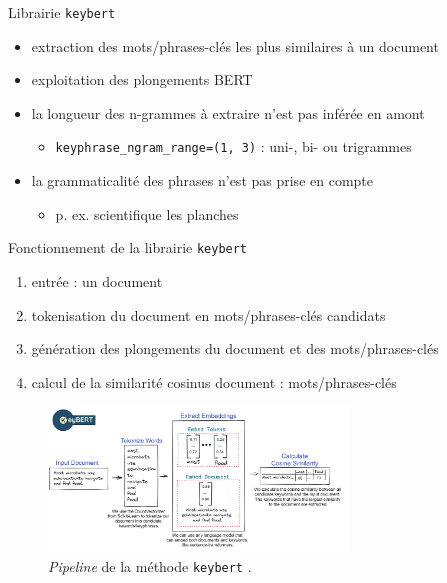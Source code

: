 \begin{frame}{Librairie \texttt{keybert}}
\pause
\begin{itemize}[<+->]
\item extraction des mots/phrases-clés les plus similaires à un document
\item exploitation des plongements \textsc{BERT}\\
\hspace{-2cm}\item[\dangersign] la longueur des n-grammes à extraire n'est pas inférée en amont
\begin{itemize}[<+->]
\item \texttt{keyphrase\_ngram\_range=(1, 3)} : uni-, bi- ou trigrammes
\end{itemize}
\hspace{-2cm}\item[\dangersign] la grammaticalité des phrases n'est pas prise en compte \begin{itemize}
\item p. ex. \og{}scientifique les planches\fg{}
\end{itemize}
\end{itemize}
\end{frame}

\begin{frame}{Fonctionnement de la librairie \texttt{keybert}}
\pause
\begin{enumerate}[<+->]
\item entrée : un document
\item tokenisation du document en mots/phrases-clés candidats
\item génération des plongements du document et des mots/phrases-clés
\item calcul de la similarité cosinus document : mots/phrases-clés
\end{enumerate}
\begin{figure}
    \centering
    \includegraphics[width=80mm,scale=0.5]{pic/keybert.png}
    \caption{\textit{Pipeline} de la méthode \texttt{keybert} \citep{grootendorst2020keybert}.}
    \label{fig:enter-label}
\end{figure}
\end{frame}

